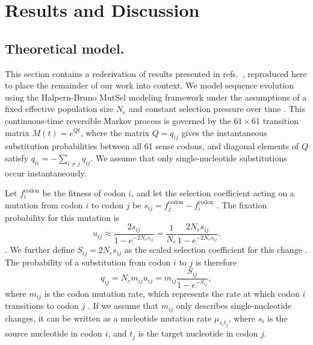\documentclass[11pt]{article}
\begin{document}
		
\section*{Results and Discussion}
		
		
\subsection*{Theoretical model.}
This section contains a rederivation of results presented in refs.\ \cite{HalpernBruno1998,YangNielsen2008}, reproduced here to place the remainder of our work into context. We model sequence evolution using the Halpern-Bruno MutSel modeling framework under the assumptions of a fixed effective population size $N_e$ and constant selection pressure over time \cite{HalpernBruno1998,YangNielsen2008,Tamurietal2012,Thorne2012}.  This continuous-time reversible Markov process is governed by the $61 \times 61$ transition matrix $M(t) = e^{Qt}$, where the matrix $Q = q_{ij}$ gives the instantaneous substitution probabilities between all 61 sense codons, and diagonal elements of $Q$ satisfy $q_{ii} = -\sum_{i \neq j} q_{ij}$. We assume that only single-nucleotide substitutions occur instantaneously. 

Let $f^\text{codon}_i$ be the fitness of codon $i$, and let the selection coefficient acting on a mutation from codon $i$ to codon $j$ be $s_{ij} = f^\text{codon}_j - f^\text{codon}_i$ \cite{SellaHirsh2005,YangNielsen2008}. The fixation probability for this mutation is \cite{Kimura1962,HalpernBruno1998,YangNielsen2008}
\begin{equation}\label{eq:u_ij}
u_{ij} \approx \frac{2s_{ij}}{1 - e^{-2N_es_{ij}}} = \frac{1}{N_e}\frac{2N_es_{ij}}{1 - e^{-2N_es_{ij}}} .
\end{equation}. We further define $S_{ij} = 2N_es_{ij}$ as the scaled selection coefficient for this change \cite{YangNielsen2008}. The probability of a substitution from codon $i$ to $j$ is therefore
\begin{equation}\label{eq:q_ij}
q_{ij} = N_em_{ij}u_{ij} = m_{ij}\frac{S_{ij}}{1 - e^{-S_{ij}}} , 
\end{equation} where $m_{ij}$ is the codon mutation rate, which represents the rate at which codon $i$ transitions to codon $j$  \cite{HalpernBruno1998,SellaHirsh2005}. If we assume that $m_{ij}$ only describes single-nucleotide changes, it can be written as a nucleotide mutation rate $\mu_{s_it_j}$, where $s_i$ is the source nucleotide in codon $i$, and $t_j$ is the target nucleotide in codon $j$.
\end{document}

